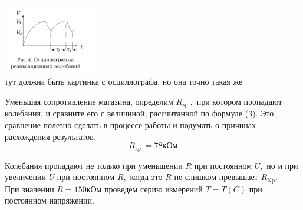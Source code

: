 \begin{center}
\includegraphics[width=0.3\textwidth]{4.PNG} \\
тут должна быть картинка с осциллографа, но она точно такая же\\
\end{center}

Уменьшая сопротивление магазина, определим $R_{\text {кр }},$ при котором пропадают колебания, и сравните его с величиной, рассчитанной по формуле (3). Это сравнение полезно сделать в процессе работы и подумать о причинах расхождения результатов.\\

$$R_{\text {кр }}  = 78 кОм$$

Колебания пропадают не только при уменьшении $R$ при постоянном $U,$ но и при увеличении $U$ при постоянном $R,$ когда это $R$ не слишком превышает $R_{\mathrm{Kp}}$. \\

При значении $R = 150 кОм$ проведем серию измерений $T = T(C)$ при постоянном напряжении. \\

